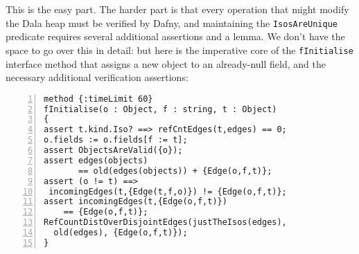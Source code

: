 This is the easy part. The harder part is that every operation that might modify the Dala heap must be verified by Dafny, and 
maintaining the \lstinline+IsosAreUnique+ predicate 
requires several additional assertions and a lemma.  We don't have the space to go over this in detail: but here is the imperative core of the \lstinline+fInitialise+ interface method that assigns a 
new object to an already-null field, and the necessary additional verification assertions:

%


\begin{lstlisting}[numbers=left,stepnumber=1,firstnumber=1,xleftmargin=5mm]
method {:timeLimit 60}
fInitialise(o : Object, f : string, t : Object) 
{ 
assert t.kind.Iso? ==> refCntEdges(t,edges) == 0;
o.fields := o.fields[f := t];  
assert ObjectsAreValid({o});
assert edges(objects)
       == old(edges(objects)) + {Edge(o,f,t)};
assert (o != t) ==>
 incomingEdges(t,{Edge(t,f,o)}) != {Edge(o,f,t)};
assert incomingEdges(t,{Edge(o,f,t)})
    == {Edge(o,f,t)};
RefCountDistOverDisjointEdges(justTheIsos(edges), 
  old(edges), {Edge(o,f,t)});
}
\end{lstlisting}


